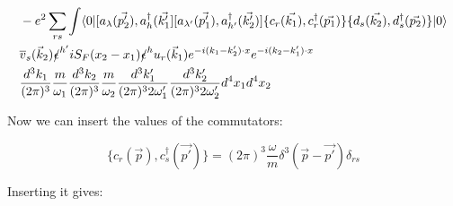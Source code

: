 \documentclass[a4]{article}
\begin{document}
\begin{framed}
\begin{equation}
\begin{aligned}
                    & - e^{2} \sum_{r s} \int \langle 0 |[a_{\lambda} (\vec{p'_2}),a^{\dagger}_{h} (\vec{k'_1}] [a_{\lambda'} (\vec{p'_1}), a^{\dagger}_{h'} (\vec{k'_2})] \{c_{r} (\vec{k_1}), c^{\dagger}_{r} (\vec{p_1}) \} \{d_{s} (\vec{k_2}), d^{\dagger}_{s} (\vec{p_2}) \}| 0 \rangle \\
                    & \overline{v}_{s} (\vec{k}_2) \slashed{\epsilon}^{h'} i S_{F} (x_2 - x_1) \slashed{\epsilon}^{h} u_{r} (\vec{k}_1) e^{- i (k_1 - k'_2) \cdot x} e^{- i (k_2 - k'_1) \cdot x} \\
                    & \frac{d^3 k_1}{(2 \pi)^{3}} \frac{m}{\omega_1} \frac{d^3 k_2}{(2 \pi)^{3}} \frac{m}{\omega_2} \frac{d^3 k'_1}{(2 \pi)^{3} 2 \omega'_1} \frac{d^3 k'_2}{(2 \pi)^{3} 2 \omega'_2} d^4 x_1 d^4 x_2
                \end{aligned}
            \end{equation}

            Now we can insert the values of the commutators:

            \begin{equation}
                \{c_{r} (\vec{p}), c^{\dag}_{s} (\vec{p'}) \} = (2 \pi)^{3} \frac{\omega}{m} \delta^{3} (\vec{p} - \vec{p'}) \delta_{rs}
            \end{equation}

            \pagebreak 

            Inserting it gives:


\end{framed}
\end{document}
